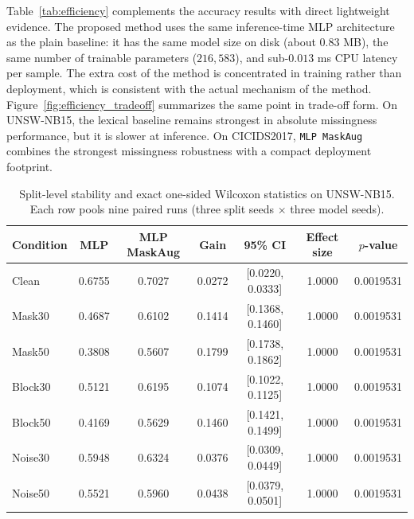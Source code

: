 Table~\ref{tab:efficiency} complements the accuracy results with direct lightweight evidence. The proposed method uses the same inference-time MLP architecture as the plain baseline: it has the same model size on disk (about $0.83$ MB), the same number of trainable parameters ($216{,}583$), and sub-$0.013$ ms CPU latency per sample. The extra cost of the method is concentrated in training rather than deployment, which is consistent with the actual mechanism of the method. Figure~\ref{fig:efficiency_tradeoff} summarizes the same point in trade-off form. On UNSW-NB15, the lexical baseline remains strongest in absolute missingness performance, but it is slower at inference. On CICIDS2017, \texttt{MLP MaskAug} combines the strongest missingness robustness with a compact deployment footprint.

\begin{table}[t]
\centering
\caption{Split-level stability and exact one-sided Wilcoxon statistics on UNSW-NB15. Each row pools nine paired runs (three split seeds $\times$ three model seeds).}
\label{tab:split_significance}
\begin{tabular}{lcccccc}
\toprule
Condition & MLP & MLP MaskAug & Gain & 95\% CI & Effect size & $p$-value \\
\midrule
Clean & 0.6755 & 0.7027 & 0.0272 & [0.0220, 0.0333] & 1.0000 & 0.0019531 \\
Mask30 & 0.4687 & 0.6102 & 0.1414 & [0.1368, 0.1460] & 1.0000 & 0.0019531 \\
Mask50 & 0.3808 & 0.5607 & 0.1799 & [0.1738, 0.1862] & 1.0000 & 0.0019531 \\
Block30 & 0.5121 & 0.6195 & 0.1074 & [0.1022, 0.1125] & 1.0000 & 0.0019531 \\
Block50 & 0.4169 & 0.5629 & 0.1460 & [0.1421, 0.1499] & 1.0000 & 0.0019531 \\
Noise30 & 0.5948 & 0.6324 & 0.0376 & [0.0309, 0.0449] & 1.0000 & 0.0019531 \\
Noise50 & 0.5521 & 0.5960 & 0.0438 & [0.0379, 0.0501] & 1.0000 & 0.0019531 \\
\bottomrule
\end{tabular}
\end{table}

